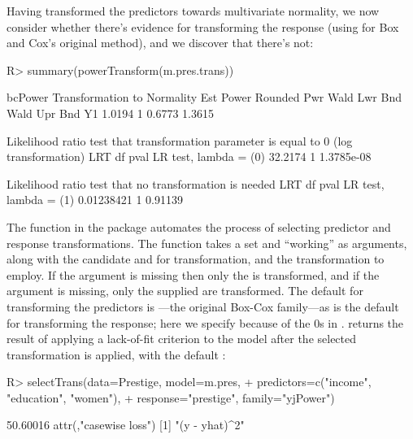 \documentclass[
]{jss}
\begin{document}
Having transformed the predictors towards multivariate normality, we now
consider whether there's evidence for transforming the response (using
 for Box and Cox's original method), and we
discover that there's not:

\begin{CodeChunk}
\begin{CodeInput}
R> summary(powerTransform(m.pres.trans))
\end{CodeInput}
\begin{CodeOutput}
bcPower Transformation to Normality 
   Est Power Rounded Pwr Wald Lwr Bnd Wald Upr Bnd
Y1    1.0194           1       0.6773       1.3615

Likelihood ratio test that transformation parameter is equal to 0
 (log transformation)
                          LRT df       pval
LR test, lambda = (0) 32.2174  1 1.3785e-08

Likelihood ratio test that no transformation is needed
                             LRT df    pval
LR test, lambda = (1) 0.01238421  1 0.91139
\end{CodeOutput}
\end{CodeChunk}

The  function in the  package automates the
process of selecting predictor and response transformations. The
function takes a  set and ``working''  as
arguments, along with the candidate  and
 for transformation, and the transformation 
to employ. If the  argument is missing then only the
 is transformed, and if the  argument is
missing, only the supplied  are transformed. The
default  for transforming the predictors is
---the original Box-Cox family---as is the default
 for transforming the response; here we specify
 because of the 0s in .
 returns the result of applying a lack-of-fit
criterion to the model after the selected transformation is applied,
with the default :

\begin{CodeChunk}
\begin{CodeInput}
R> selectTrans(data=Prestige, model=m.pres,
+             predictors=c("income", "education", "women"),
+             response="prestige", family="yjPower")
\end{CodeInput}
\begin{CodeOutput}
[1] 50.60016
attr(,"casewise loss")
[1] "(y - yhat)^2"
\end{CodeOutput}
\end{CodeChunk}
\end{document}
